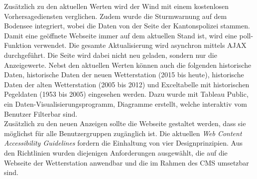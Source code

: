 \documentclass[10pt]{article}
\begin{document}
\begin{multicols}{2}
Zusätzlich zu den aktuellen Werten wird der Wind mit einem kostenlosen Vorhersagediensten verglichen. Zudem wurde die Sturmwarnung auf dem Bodensee integriert, wobei die Daten von der Seite der Kantonspolizei stammen. Damit eine geöffnete Webseite immer auf dem aktuellen Stand ist, wird eine poll-Funktion verwendet. Die gesamte Aktualisierung wird asynchron mittels AJAX durchgeführt. Die Seite wird dabei nicht neu geladen, sondern nur die Anzeigewerte. Nebst den aktuellen Werten können auch die folgenden historische Daten, historische Daten der neuen Wetterstation (2015 bis heute), historische Daten der alten Wetterstation (2005 bis 2012) und Exceltabelle mit historischen Pegeldaten (1953 bis 2005) eingesehen werden. Dazu wurde mit Tableau Public, ein Daten-Visualisierungsprogramm, Diagramme erstellt, welche interaktiv vom Benutzer Filterbar sind.\\ 
Zusätzlich zu den neuen Anzeigen sollte die Webseite gestaltet werden, dass sie möglichst für alle Benutzergruppen zugänglich ist. Die aktuellen \emph{Web Content Accessibility Guidelines} fordern die Einhaltung von vier Designprinzipien. Aus den Richtlinien wurden diejenigen Anforderungen ausgewählt, die auf die Webseite der Wetterstation anwendbar und die im Rahmen des CMS umsetzbar sind. \\

\end{multicols}
\end{document}
